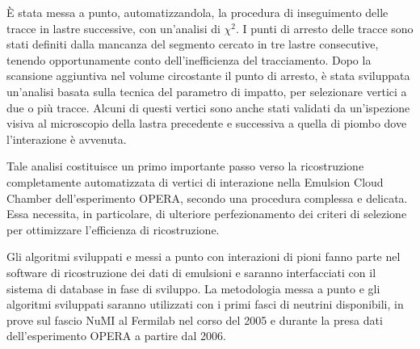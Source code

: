 \`E stata messa a punto, automatizzandola, la procedura di
inseguimento delle tracce in lastre successive, con un'analisi di
$\chi^2$. I punti di arresto delle tracce sono stati definiti  dalla
mancanza del segmento cercato in tre lastre consecutive, tenendo
opportunamente conto dell'inefficienza del tracciamento. Dopo la
scansione aggiuntiva nel volume circostante il punto di arresto, \`e stata
sviluppata un'analisi basata sulla tecnica del parametro di impatto, per
selezionare vertici a due o pi\`u tracce. Alcuni di questi
vertici sono anche stati validati da un'ispezione visiva al
microscopio della lastra precedente e successiva a quella di piombo
dove l'interazione \`e avvenuta. 


Tale analisi costituisce un primo importante passo verso la ricostruzione 
completamente automatizzata di vertici di interazione nella Emulsion Cloud Chamber 
dell'esperimento OPERA, secondo una procedura complessa e delicata.
Essa necessita, in particolare, di ulteriore perfezionamento dei criteri di selezione
 per ottimizzare l'efficienza di ricostruzione.

Gli algoritmi sviluppati e messi a punto con interazioni di pioni fanno
parte nel software di ricostruzione dei dati di emulsioni e saranno
interfacciati con il sistema di database in fase di sviluppo. La
metodologia messa a punto e gli algoritmi sviluppati saranno utilizzati
con i primi fasci di neutrini disponibili, in prove sul fascio NuMI al Fermilab
nel corso del 2005 e durante la presa dati dell'esperimento OPERA a
partire dal 2006.
